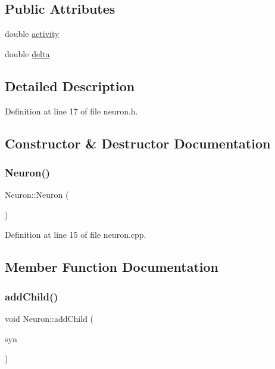 \subsection*{Public Attributes}
\begin{DoxyCompactItemize}
\item 
double \hyperlink{class_neuron_a4f763f92e820b748629781dc8791ab9d}{activity}
\item 
double \hyperlink{class_neuron_aa2823ed0557b8296ed5987601bad30ed}{delta}
\end{DoxyCompactItemize}


\subsection{Detailed Description}


Definition at line 17 of file neuron.\+h.



\subsection{Constructor \& Destructor Documentation}
\mbox{\label{class_neuron_a823487d01615fadb8ac19a2768dd9d96}} 
\subsubsection{\texorpdfstring{Neuron()}{Neuron()}}
{\footnotesize\ttfamily Neuron\+::\+Neuron (\begin{DoxyParamCaption}{ }\end{DoxyParamCaption})}



Definition at line 15 of file neuron.\+cpp.



\subsection{Member Function Documentation}
\mbox{\label{class_neuron_a2960eb3ff73bd14d345f2204b2b887a4}} 
\subsubsection{\texorpdfstring{add\+Child()}{addChild()}}
{\footnotesize\ttfamily void Neuron\+::add\+Child (\begin{DoxyParamCaption}\item[{\hyperlink{neural_network_8h_ac587b5c69519c070958c5cb318ddc50f}{Synapse\+Ptr}}]{syn }\end{DoxyParamCaption})}



